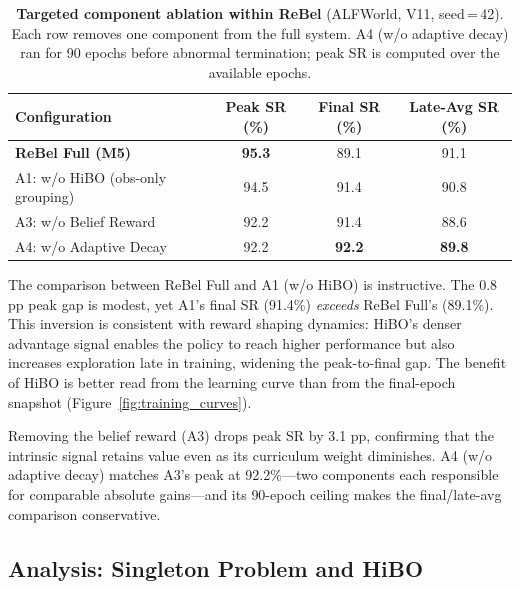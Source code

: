 \begin{table}[t]
  \centering
  \caption{%
    \textbf{Targeted component ablation within ReBel} (ALFWorld, V11, seed\,=\,42).
    Each row removes one component from the full system.
    A4 (w/o adaptive decay) ran for 90 epochs before abnormal termination;
    peak SR is computed over the available epochs.
  }
  \label{tab:ablation_v11}
  \vspace{4pt}
  \small
  \renewcommand{\arraystretch}{1.15}
  \begin{tabular}{@{}lccc@{}}
    \toprule
    \textbf{Configuration}
      & \textbf{Peak SR (\%)}
      & \textbf{Final SR (\%)}
      & \textbf{Late-Avg SR (\%)} \\
    \midrule
    \textbf{ReBel Full (M5)}         & \textbf{95.3} & 89.1          & 91.1          \\
    A1: w/o HiBO (obs-only grouping) & 94.5          & 91.4          & 90.8          \\
    A3: w/o Belief Reward            & 92.2          & 91.4          & 88.6          \\
    A4: w/o Adaptive Decay           & 92.2          & \textbf{92.2} & \textbf{89.8} \\
    \bottomrule
  \end{tabular}
\end{table}

The comparison between ReBel Full and A1 (w/o HiBO) is instructive.
The 0.8 pp peak gap is modest, yet A1's final SR (91.4\%) \emph{exceeds}
ReBel Full's (89.1\%).
This inversion is consistent with reward shaping dynamics: HiBO's denser advantage
signal enables the policy to reach higher performance but also increases exploration
late in training, widening the peak-to-final gap.
The benefit of HiBO is better read from the learning curve than from the final-epoch
snapshot (Figure~\ref{fig:training_curves}).

Removing the belief reward (A3) drops peak SR by 3.1 pp, confirming that the
intrinsic signal retains value even as its curriculum weight diminishes.
A4 (w/o adaptive decay) matches A3's peak at 92.2\%---two components each
responsible for comparable absolute gains---and its 90-epoch ceiling makes the
final/late-avg comparison conservative.


\subsection{Analysis: Singleton Problem and HiBO}
\label{sec:hibo_analysis}

